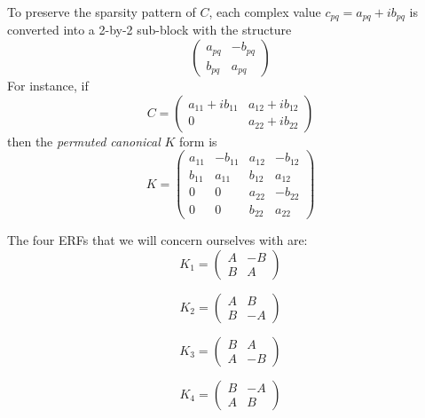 \documentclass{report}
\begin{document}
To preserve the sparsity pattern of $C$, each complex value $c_{pq} =
a_{pq} + ib_{pq}$ is converted into a 2-by-2 sub-block with the structure
\begin{equation*} \left( \begin{array}{rr} a_{pq} & -b_{pq} \\ b_{pq} &
a_{pq}
\end{array} \right) \end{equation*}
For instance, if
\begin{equation*} C = \left(
\begin{array}{cc} a_{11} +
i b_{11} & a_{12} + i b_{12} \\
0 & a_{22} + i b_{22}
\end{array}
\right)
\end{equation*}
then the \emph{permuted canonical} $K$ form is
\begin{equation*}
K = \left( \begin{array}{cccc} a_{11} & -b_{11} & a_{12} & -b_{12}
\\ b_{11} & a_{11} & b_{12} & a_{12} \\ 0 & 0 & a_{22} &
-b_{22} \\ 0 & 0 & b_{22} & a_{22} \end{array} \right)
\end{equation*}

The four ERFs that we will concern ourselves with are:
\begin{equation*} K_1 = \left(
\begin{array}{rr} A & -B \\ B & A \end{array} \right)
\end{equation*}

\begin{equation*} K_2 = \left(
\begin{array}{rr} A & B \\ B & -A \end{array} \right)
\end{equation*}

\begin{equation*} K_3 = \left(
\begin{array}{rr} B & A \\ A & -B \end{array} \right)
\end{equation*}

\begin{equation*} K_4 = \left(
\begin{array}{rr} B & -A \\ A & B \end{array} \right)
\end{equation*}
\end{document}

